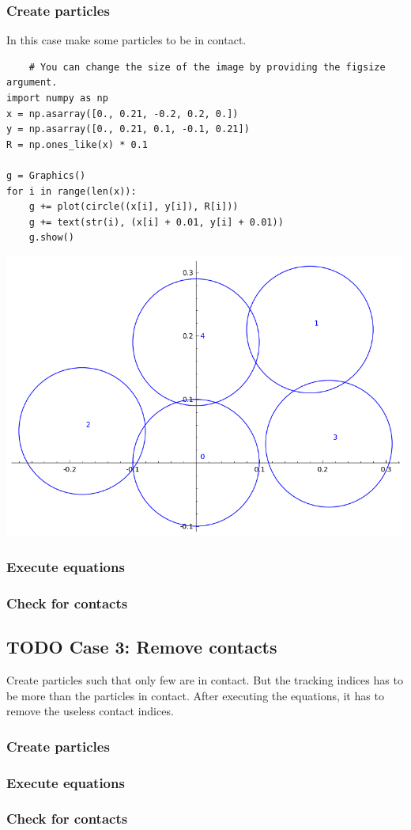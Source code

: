\documentclass[11pt]{article}
\begin{document}
\subsubsection{Create particles}
\label{sec:orgeda8e99}
In this case make some particles to be in contact.
\begin{verbatim}
	# You can change the size of the image by providing the figsize argument.
import numpy as np
x = np.asarray([0., 0.21, -0.2, 0.2, 0.])
y = np.asarray([0., 0.21, 0.1, -0.1, 0.21])
R = np.ones_like(x) * 0.1

g = Graphics()
for i in range(len(x)):
    g += plot(circle((x[i], y[i]), R[i]))
    g += text(str(i), (x[i] + 0.01, y[i] + 0.01))
    g.show()
\end{verbatim}

\begin{center}
\includegraphics[width=.9\linewidth]{test_figures/test_case_2.png}
\end{center}

\subsubsection{Execute equations}
\label{sec:orgc1ba476}
\subsubsection{Check for contacts}
\label{sec:org66081ea}

\subsection{{\bfseries\sffamily TODO} Case 3: Remove contacts}
\label{sec:org9537e97}
Create particles such that only few are in contact. But the tracking indices
has to be more than the particles in contact. After executing the equations,
it has to remove the useless contact indices.

\subsubsection{Create particles}
\label{sec:orgdad66ea}
\subsubsection{Execute equations}
\label{sec:orgb8222bd}
\subsubsection{Check for contacts}
\label{sec:org9f366d9}
\end{document}
